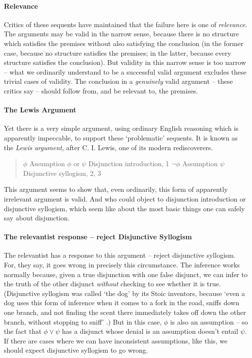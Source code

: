 \paragraph{Relevance} Critics of these sequents have maintained that the failure here is one of \emph{relevance}. The arguments may be valid in the narrow sense, because there is no structure which satisfies the premises without also satisfying the conclusion (in the former case, because no structure satisfies the premises; in the latter, because every structure satisfies the conclusion). But validity in this narrow sense is too narrow – what we ordinarily understand to be a successful valid argument excludes these trivial cases of validity. The conclusion in a \emph{genuinely} valid argument – these critics say – should follow from, and be relevant to, the premises.

\paragraph{The Lewis Argument} Yet there is a very simple argument, using ordinary English reasoning which is apparently impeccable, to support these `problematic' sequents. It is known as the \emph{Lewis argument}, after C. I. Lewis, one of its modern rediscoverers. 
\begin{quote}
	\begin{exe}
	\ex $\phi$ \hfill Assumption
	\ex $\phi$ or $\psi$ \hfill Disjunction introduction, 1
	\ex $\neg \phi$ \hfill Assumption 
	\ex $\psi$ \hfill  Disjunctive syllogism, 2, 3
\end{exe}
\end{quote}
This argument seems to show that, even ordinarily, this form of apparently irrelevant argument is valid. And who could object to disjunction introduction or disjunctive syllogism, which seem like about the most basic things one can safely say about disjunction.

\paragraph{The relevantist response – reject Disjunctive Syllogism} The relevantist has a response to this argument – reject disjunctive syllogism. For, they say, it goes wrong in precisely this circumstance. The inference works normally because, given a true disjunction with one false disjunct, we can infer to the truth of the other disjunct \emph{without} checking to see whether it is true. (Disjunctive syllogism was called `the dog' by its Stoic inventors, because `even a dog uses this form of inference when it comes to a fork in the road, sniffs down one branch, and not finding the scent there immediately takes off down the other branch, without stopping to sniff' \citep[99--100]{burphilo}.) But in this case, $\phi$  is also an assumption – so the fact that $\phi \vee \psi$ has a disjunct whose denial is an assumption doesn't entail $\psi$. If there are cases where we can have inconsistent assumptions, like this, we should expect disjunctive syllogism to go wrong.

